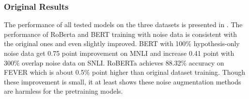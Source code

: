 \subsubsection{Original Results}

The performance of all tested models on the three datasets 
is presented in .
The performance of RoBerta  and BERT training with noise data 
is consistent with the original ones and even slightly improved. 
BERT with 100\% hypothesis-only noise data get 0.75 point improvement on MNLI 
and increase 0.41 point with 300\% overlap noise data on SNLI. 
RoBERTa achieves 88.32\% accuracy on FEVER which is about 0.5\% point 
higher than original dataset training. Though these improvement is small, it at least shows 
these noise augmentation methods are harmless for the pretraining models.


